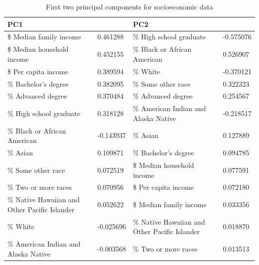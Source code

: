 \documentclass{article}
\begin{document}
\begin{table}[]
\centering
\caption{First two principal components for socioeconomic data}
\label{pcs_socio}
\begin{tabular}{|l|l|l|l|}
\hline
\multicolumn{2}{|l|}{PC1}                                 & \multicolumn{2}{l|}{PC2}                                  \\ \hline
\$ Median family income                       & 0.461288  & \% High school graduate                       & -0.575076 \\ \hline
\$ Median household income                    & 0.452155  & \% Black or African American                  & 0.526907  \\ \hline
\$ Per capita income                          & 0.389594  & \% White                                      & -0.370121 \\ \hline
\% Bachelor's degree                          & 0.382095  & \% Some other race                            & 0.322323  \\ \hline
\% Advanced degree                            & 0.370484  & \% Advanced degree                            & 0.254567  \\ \hline
\% High school graduate                       & 0.318128  & \% American Indian and Alaska Native          & -0.218517 \\ \hline
\% Black or African American                  & -0.143937 & \% Asian                                      & 0.127889  \\ \hline
\% Asian                                      & 0.109871  & \% Bachelor's degree                          & 0.094785  \\ \hline
\% Some other race                            & 0.072519  & \$ Median household income                    & 0.077591  \\ \hline
\% Two or more races                          & 0.070956  & \$ Per capita income                          & 0.072180  \\ \hline
\% Native Hawaiian and Other Pacific Islander & 0.052622  & \$ Median family income                       & 0.033356  \\ \hline
\% White                                      & -0.025696 & \% Native Hawaiian and Other Pacific Islander & 0.018870  \\ \hline
\% American Indian and Alaska Native          & -0.003568 & \% Two or more races                          & 0.013513  \\ \hline
\end{tabular}
\end{table}
\twocolumn



\end{document}
